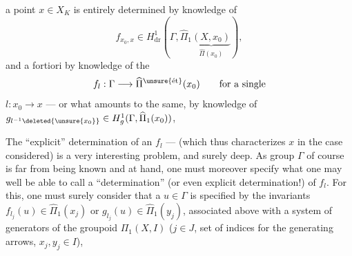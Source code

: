 a point $x\in X_K$ is entirely determined by knowledge of 
\[
f_{x_0,x}\in H^1_{\mathrm{dr}}(\Gamma,\widehat\Pi_1\underbrace{(X,x_0)}_{\widehat\Pi(x_0)}),
\]
and a fortiori by knowledge of the 
\[
f_l:\Gamma\longrightarrow\widehat\Pi^{\unsure{\text{ét}}}(x_0)\qquad\text{for a single}
\]
$l:x_0\longrightarrow x$ --- or what amounts to the same, by knowledge of $g_{l^{-1}\deleted{\unsure{x_0}}}\in H^1_g(\Gamma,\widehat\Pi_1(x_0))$, 

 The ``explicit'' determination of an $f_l$ ---  (which thus characterizes $x$ in the case considered) is a very interesting problem, and surely deep. As   group $\Gamma$ of course is far from being known and at hand, one must moreover specify what one may well be able to call a ``determination'' (or even explicit determination!) of $f_l$. For this, one must surely consider that a $u\in\Gamma$ is specified by the invariants $f_{l_j}(u)\in\widehat\Pi_1(x_j)$ or $g_{l_j}(u)\in\widehat\Pi_1(y_j)$, associated above with a  system of generators  of the groupoid $\Pi_1(X,I)$ ($j\in J$, set of indices for the generating arrows, $x_j,y_j\in I$),
